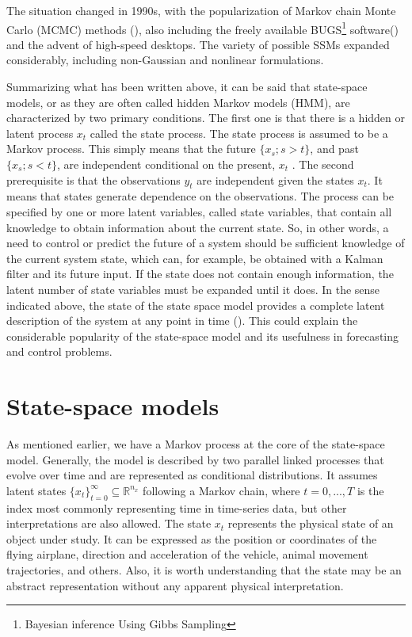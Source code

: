 The situation changed in 1990s, with the popularization of Markov chain Monte Carlo (MCMC) methods (\textcite{gilks_markov_1995}), also including the freely available BUGS\footnote{Bayesian inference Using Gibbs Sampling} software(\textcite{lunn_bugs_2009}) and the advent of high-speed desktops. The variety of possible SSMs expanded considerably, including non-Gaussian and nonlinear formulations.

Summarizing what has been written above, it can be said that state-space models, or as they are often called hidden Markov models (HMM),  are characterized by two primary conditions. The first one is that there is a hidden or latent process \(x_t\) called the state process. The state process is assumed to be a Markov process. This simply means that the future \(\{x_s ; s > t\}\), and past \(\{x_s ; s < t\}\), are independent conditional on the present, \(x_t\) . The second prerequisite is that the observations \(y_t\) are independent given the states \(x_t\). It means that states generate dependence on the observations. The process can be specified by one or more latent variables, called state variables, that contain all knowledge to obtain information about the current state.
So, in other words, a need to control or predict the future of a system should be sufficient knowledge of the current system state, which can, for example, be obtained with a Kalman filter and its future input. If the state does not contain enough information, the latent number of state variables must be expanded until it does. In the sense indicated above, the state of the state space model provides a complete latent description of the system at any point in time (\textcite{willems_introduction_1997}). This could explain the considerable popularity of the state-space model and its usefulness in forecasting and control problems.


\section{State-space models}

As mentioned earlier, we have a Markov process at the core of the state-space model. Generally, the model is described by two parallel linked processes that evolve over time and are represented as conditional distributions. It assumes latent states \(\{x_t\}^\infty_{t=0} \subseteq \mathbb{R}^{n_x} \) following a Markov chain, where \(t = 0,...,T\) is the index most commonly representing time in time-series data, but other interpretations are also allowed. The state \(x_t\) represents the physical state of an object under study. It can be expressed as the position or coordinates of the flying airplane, direction and acceleration of the vehicle, animal movement trajectories, and others. Also, it is worth understanding that the state may be an abstract representation without any apparent physical interpretation.  

